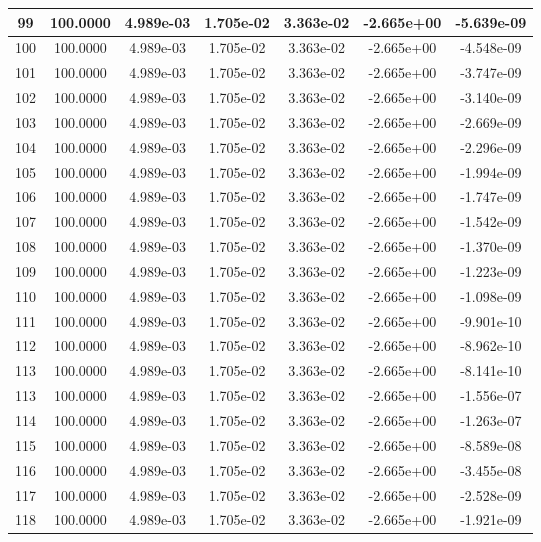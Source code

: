 \documentclass[10pt]{report}
\begin{document}
\begin{table}[H]
\begin{center}
\begin{tabular}{|c|c|c|c|c|c|c|}
99 & 100.0000 & 4.989e-03 & 1.705e-02 & 3.363e-02 & -2.665e+00 & -5.639e-09\\ \hline
100 & 100.0000 & 4.989e-03 & 1.705e-02 & 3.363e-02 & -2.665e+00 & -4.548e-09\\ \hline
101 & 100.0000 & 4.989e-03 & 1.705e-02 & 3.363e-02 & -2.665e+00 & -3.747e-09\\ \hline
102 & 100.0000 & 4.989e-03 & 1.705e-02 & 3.363e-02 & -2.665e+00 & -3.140e-09\\ \hline
103 & 100.0000 & 4.989e-03 & 1.705e-02 & 3.363e-02 & -2.665e+00 & -2.669e-09\\ \hline
104 & 100.0000 & 4.989e-03 & 1.705e-02 & 3.363e-02 & -2.665e+00 & -2.296e-09\\ \hline
105 & 100.0000 & 4.989e-03 & 1.705e-02 & 3.363e-02 & -2.665e+00 & -1.994e-09\\ \hline
106 & 100.0000 & 4.989e-03 & 1.705e-02 & 3.363e-02 & -2.665e+00 & -1.747e-09\\ \hline
107 & 100.0000 & 4.989e-03 & 1.705e-02 & 3.363e-02 & -2.665e+00 & -1.542e-09\\ \hline
108 & 100.0000 & 4.989e-03 & 1.705e-02 & 3.363e-02 & -2.665e+00 & -1.370e-09\\ \hline
109 & 100.0000 & 4.989e-03 & 1.705e-02 & 3.363e-02 & -2.665e+00 & -1.223e-09\\ \hline
110 & 100.0000 & 4.989e-03 & 1.705e-02 & 3.363e-02 & -2.665e+00 & -1.098e-09\\ \hline
111 & 100.0000 & 4.989e-03 & 1.705e-02 & 3.363e-02 & -2.665e+00 & -9.901e-10\\ \hline
112 & 100.0000 & 4.989e-03 & 1.705e-02 & 3.363e-02 & -2.665e+00 & -8.962e-10\\ \hline
113 & 100.0000 & 4.989e-03 & 1.705e-02 & 3.363e-02 & -2.665e+00 & -8.141e-10\\ \hline
113 & 100.0000 & 4.989e-03 & 1.705e-02 & 3.363e-02 & -2.665e+00 & -1.556e-07\\ \hline
114 & 100.0000 & 4.989e-03 & 1.705e-02 & 3.363e-02 & -2.665e+00 & -1.263e-07\\ \hline
115 & 100.0000 & 4.989e-03 & 1.705e-02 & 3.363e-02 & -2.665e+00 & -8.589e-08\\ \hline
116 & 100.0000 & 4.989e-03 & 1.705e-02 & 3.363e-02 & -2.665e+00 & -3.455e-08\\ \hline
117 & 100.0000 & 4.989e-03 & 1.705e-02 & 3.363e-02 & -2.665e+00 & -2.528e-09\\ \hline
118 & 100.0000 & 4.989e-03 & 1.705e-02 & 3.363e-02 & -2.665e+00 & -1.921e-09\\ \hline

\end{tabular}
\end{center}
\end{table}
\end{document}
